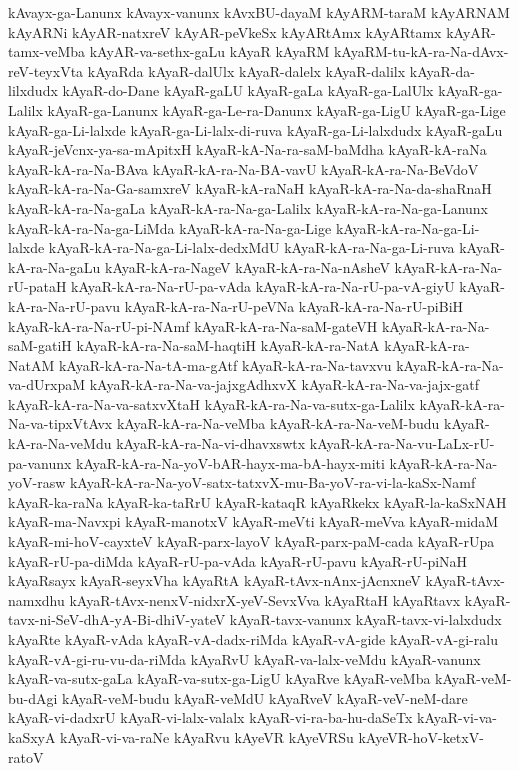 {kAvayx-ga-Lanunx
kAvayx-vanunx
kAvxBU-dayaM
kAyARM-taraM
kAyARNAM
kAyARNi
kAyAR-natxreV
kAyAR-peVkeSx
kAyARtAmx
kAyARtamx
kAyAR-tamx-veMba
kAyAR-va-sethx-gaLu
kAyaR
kAyaRM
kAyaRM-tu-kA-ra-Na-dAvx-reV-teyxVta
kAyaRda
kAyaR-dalUlx
kAyaR-dalelx
kAyaR-dalilx
kAyaR-da-lilxdudx
kAyaR-do-Dane
kAyaR-gaLU
kAyaR-gaLa
kAyaR-ga-LalUlx
kAyaR-ga-Lalilx
kAyaR-ga-Lanunx
kAyaR-ga-Le-ra-Danunx
kAyaR-ga-LigU
kAyaR-ga-Lige
kAyaR-ga-Li-lalxde
kAyaR-ga-Li-lalx-di-ruva
kAyaR-ga-Li-lalxdudx
kAyaR-gaLu
kAyaR-jeVcnx-ya-sa-mApitxH
kAyaR-kA-Na-ra-saM-baMdha
kAyaR-kA-raNa
kAyaR-kA-ra-Na-BAva
kAyaR-kA-ra-Na-BA-vavU
kAyaR-kA-ra-Na-BeVdoV
kAyaR-kA-ra-Na-Ga-samxreV
kAyaR-kA-raNaH
kAyaR-kA-ra-Na-da-shaRnaH
kAyaR-kA-ra-Na-gaLa
kAyaR-kA-ra-Na-ga-Lalilx
kAyaR-kA-ra-Na-ga-Lanunx
kAyaR-kA-ra-Na-ga-LiMda
kAyaR-kA-ra-Na-ga-Lige
kAyaR-kA-ra-Na-ga-Li-lalxde
kAyaR-kA-ra-Na-ga-Li-lalx-dedxMdU
kAyaR-kA-ra-Na-ga-Li-ruva
kAyaR-kA-ra-Na-gaLu
kAyaR-kA-ra-NageV
kAyaR-kA-ra-Na-nAsheV
kAyaR-kA-ra-Na-rU-pataH
kAyaR-kA-ra-Na-rU-pa-vAda
kAyaR-kA-ra-Na-rU-pa-vA-giyU
kAyaR-kA-ra-Na-rU-pavu
kAyaR-kA-ra-Na-rU-peVNa
kAyaR-kA-ra-Na-rU-piBiH
kAyaR-kA-ra-Na-rU-pi-NAmf
kAyaR-kA-ra-Na-saM-gateVH
kAyaR-kA-ra-Na-saM-gatiH
kAyaR-kA-ra-Na-saM-haqtiH
kAyaR-kA-ra-NatA
kAyaR-kA-ra-NatAM
kAyaR-kA-ra-Na-tA-ma-gAtf
kAyaR-kA-ra-Na-tavxvu
kAyaR-kA-ra-Na-va-dUrxpaM
kAyaR-kA-ra-Na-va-jajxgAdhxvX
kAyaR-kA-ra-Na-va-jajx-gatf
kAyaR-kA-ra-Na-va-satxvXtaH
kAyaR-kA-ra-Na-va-sutx-ga-Lalilx
kAyaR-kA-ra-Na-va-tipxVtAvx
kAyaR-kA-ra-Na-veMba
kAyaR-kA-ra-Na-veM-budu
kAyaR-kA-ra-Na-veMdu
kAyaR-kA-ra-Na-vi-dhavxswtx
kAyaR-kA-ra-Na-vu-LaLx-rU-pa-vanunx
kAyaR-kA-ra-Na-yoV-bAR-hayx-ma-bA-hayx-miti
kAyaR-kA-ra-Na-yoV-rasw
kAyaR-kA-ra-Na-yoV-satx-tatxvX-mu-Ba-yoV-ra-vi-la-kaSx-Namf
kAyaR-ka-raNa
kAyaR-ka-taRrU
kAyaR-kataqR
kAyaRkekx
kAyaR-la-kaSxNAH
kAyaR-ma-Navxpi
kAyaR-manotxV
kAyaR-meVti
kAyaR-meVva
kAyaR-midaM
kAyaR-mi-hoV-cayxteV
kAyaR-parx-layoV
kAyaR-parx-paM-cada
kAyaR-rUpa
kAyaR-rU-pa-diMda
kAyaR-rU-pa-vAda
kAyaR-rU-pavu
kAyaR-rU-piNaH
kAyaRsayx
kAyaR-seyxVha
kAyaRtA
kAyaR-tAvx-nAnx-jAcnxneV
kAyaR-tAvx-namxdhu
kAyaR-tAvx-nenxV-nidxrX-yeV-SevxVva
kAyaRtaH
kAyaRtavx
kAyaR-tavx-ni-SeV-dhA-yA-Bi-dhiV-yateV
kAyaR-tavx-vanunx
kAyaR-tavx-vi-lalxdudx
kAyaRte
kAyaR-vAda
kAyaR-vA-dadx-riMda
kAyaR-vA-gide
kAyaR-vA-gi-ralu
kAyaR-vA-gi-ru-vu-da-riMda
kAyaRvU
kAyaR-va-lalx-veMdu
kAyaR-vanunx
kAyaR-va-sutx-gaLa
kAyaR-va-sutx-ga-LigU
kAyaRve
kAyaR-veMba
kAyaR-veM-bu-dAgi
kAyaR-veM-budu
kAyaR-veMdU
kAyaRveV
kAyaR-veV-neM-dare
kAyaR-vi-dadxrU
kAyaR-vi-lalx-valalx
kAyaR-vi-ra-ba-hu-daSeTx
kAyaR-vi-va-kaSxyA
kAyaR-vi-va-raNe
kAyaRvu
kAyeVR
kAyeVRSu
kAyeVR-hoV-ketxV-ratoV
}

